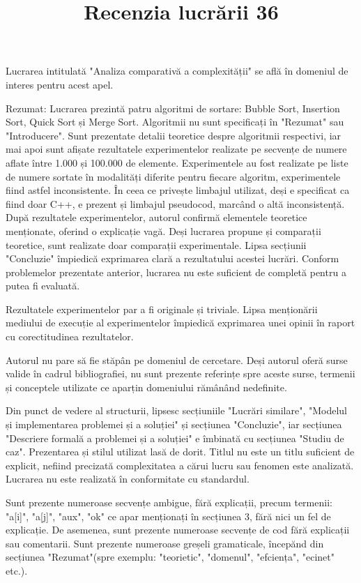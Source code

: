 \documentclass[]{article}
\title{Recenzia lucrării 36}
\date{}
\begin{document}
	
	
\maketitle
Lucrarea intitulată "Analiza comparativă a complexității" se află în domeniul de interes pentru acest apel. 

Rezumat: Lucrarea prezintă patru algoritmi de sortare: Bubble Sort, Insertion Sort, Quick Sort și Merge Sort. Algoritmii nu sunt specificați în "Rezumat" sau "Introducere". Sunt prezentate detalii teoretice despre algoritmii respectivi, iar mai apoi sunt afișate rezultatele experimentelor realizate pe secvențe de numere aflate între 1.000 și 100.000 de elemente. Experimentele au fost realizate pe liste de numere sortate în modalități diferite pentru fiecare algoritm, experimentele fiind astfel inconsistente. În ceea ce privește limbajul utilizat, deși e specificat ca fiind doar C++, e prezent și limbajul pseudocod, marcând o altă inconsistență. După rezultatele experimentelor, autorul confirmă elementele teoretice menționate, oferind o explicație vagă. Deși lucrarea propune și comparații teoretice, sunt realizate doar comparații experimentale. Lipsa secțiunii "Concluzie" împiedică exprimarea clară a rezultatului acestei lucrări. Conform problemelor prezentate anterior, lucrarea nu este suficient de completă pentru a putea fi evaluată.

Rezultatele experimentelor par a fi originale și triviale. Lipsa menționării mediului de execuție al experimentelor împiedică exprimarea unei opinii în raport cu corectitudinea rezultatelor.

Autorul nu pare să fie stăpân pe domeniul de cercetare. Deși autorul oferă surse valide în cadrul bibliografiei, nu sunt prezente referințe spre aceste surse, termenii și conceptele utilizate ce aparțin domeniului rămânând nedefinite.

Din punct de vedere al structurii, lipsesc secțiuniile "Lucrări similare", "Modelul și implementarea problemei și a soluției" și secțiunea "Concluzie", iar secțiunea "Descriere formală a problemei și a soluției" e îmbinată cu secțiunea "Studiu de caz". Prezentarea și stilul utilizat lasă de dorit. Titlul nu este un titlu suficient de explicit, nefiind precizată complexitatea a cărui lucru sau fenomen este analizată. Lucrarea nu este realizată în conformitate cu standardul. 

Sunt prezente numeroase secvențe ambigue, fără explicații, precum termenii: "a[i]", "a[j]", "aux", "ok" ce apar menționați în secțiunea 3, fără nici un fel de explicație. De asemenea, sunt prezente numeroase secvențe de cod fără explicații sau comentarii. Sunt prezente numeroase greșeli gramaticale, începănd din secțiunea "Rezumat"(spre exemplu: "teorietic", "domenul", "efciența", "ecinet" etc.).
\end{document}
